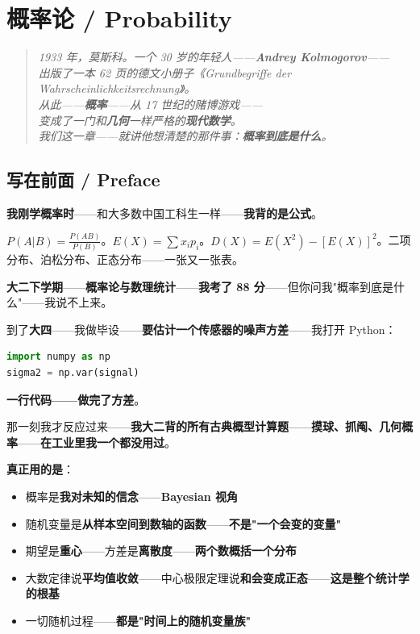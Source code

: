 
\chapter{概率论 / Probability}
\label{ch:prob}

\begin{quote}\itshape
1933 年，莫斯科。一个 30 岁的年轻人——\textbf{Andrey Kolmogorov}——\\
出版了一本 62 页的德文小册子《Grundbegriffe der Wahrscheinlichkeitsrechnung》。\\
从此——\textbf{概率}——从 17 世纪的赌博游戏——\\
变成了一门和\textbf{几何}一样严格的\textbf{现代数学}。\\
我们这一章——就讲他想清楚的那件事：\textbf{概率到底是什么}。
\end{quote}

\section{写在前面 / Preface}

\textbf{我刚学概率时}——和大多数中国工科生一样——\textbf{我背的是公式}。

$P(A|B) = \frac{P(AB)}{P(B)}$。$E(X) = \sum x_i p_i$。$D(X) = E(X^2) - [E(X)]^2$。二项分布、泊松分布、正态分布——一张又一张表。

\textbf{大二下学期}——\textbf{概率论与数理统计}——\textbf{我考了 88 分}——但你问我"概率到底是什么"——我说不上来。

到了\textbf{大四}——我做毕设——\textbf{要估计一个传感器的噪声方差}——我打开 Python：

\begin{lstlisting}[language=Python]
import numpy as np
sigma2 = np.var(signal)
\end{lstlisting}

\textbf{一行代码——做完了方差}。

那一刻我才反应过来——\textbf{我大二背的所有古典概型计算题}——\textbf{摸球、抓阄、几何概率}——\textbf{在工业里我一个都没用过}。

\textbf{真正用的是}：

\begin{itemize}
\item 概率是\textbf{我对未知的信念}——\textbf{Bayesian 视角}
\item 随机变量是\textbf{从样本空间到数轴的函数}——\textbf{不是"一个会变的变量"}
\item 期望是\textbf{重心}——方差是\textbf{离散度}——\textbf{两个数概括一个分布}
\item 大数定律说\textbf{平均值收敛}——中心极限定理说\textbf{和会变成正态}——\textbf{这是整个统计学的根基}
\item 一切随机过程——\textbf{都是"时间上的随机变量族"}
\end{itemize}


